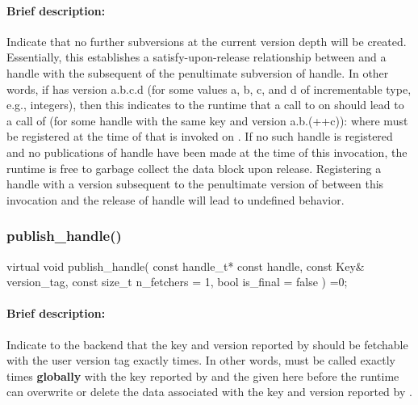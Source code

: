 \paragraph{Brief description:} Indicate that no further subversions at the current version depth will be created.
     Essentially, this establishes a satisfy-upon-release relationship between  and a handle
      with the subsequent of the penultimate subversion of handle.  In other words, if  has
       version a.b.c.d (for some values a, b, c, and d of incrementable type, e.g., integers), then this
      indicates to the runtime that a call to  on  should lead to a
       call of (for some handle  with the same key and version a.b.(++c)):
       where  must be registered at the time of that  is invoked
       on .  If no such handle is registered and no publications of handle have been made at the time
       of this invocation, the runtime is free to garbage collect the data block upon release.  Registering a
       handle with a version subsequent to the penultimate version of  between this invocation and
       the release of handle will lead to undefined behavior.


\subsubsection{publish\_handle()}
\begin{CppCode}
    virtual void
    publish_handle(
      const handle_t* const handle,
      const Key& version_tag,
      const size_t n_fetchers = 1,
      bool is_final = false
    ) =0;
\end{CppCode}

\paragraph{Brief description:} Indicate to the backend that the key and version reported by  should be fetchable
       with the user version tag  exactly  times.
       In other words,  must be called exactly  times
       {\bf globally} with the key reported by  and the  given here before the runtime
       can overwrite or delete the data associated with the key and version reported by .


